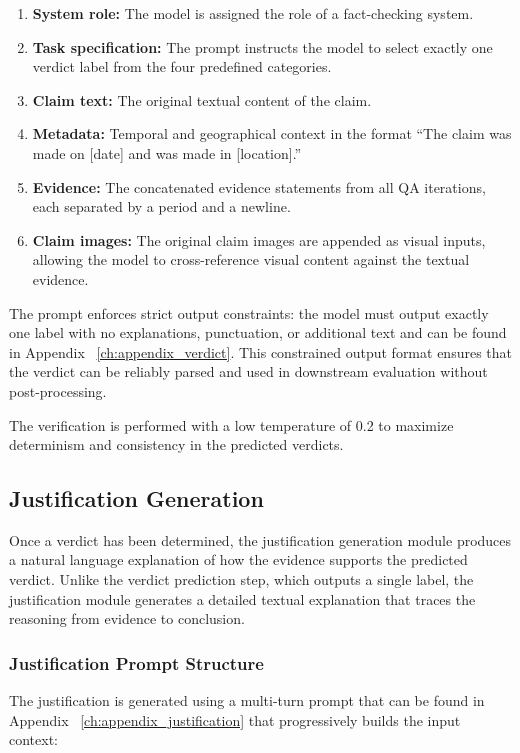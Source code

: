 \begin{enumerate}
    \item \textbf{System role:} The model is assigned the role of a fact-checking system.
    \item \textbf{Task specification:} The prompt instructs the model to select exactly one verdict label from the four predefined categories.
    \item \textbf{Claim text:} The original textual content of the claim.
    \item \textbf{Metadata:} Temporal and geographical context in the format ``The claim was made on [date] and was made in [location].''
    \item \textbf{Evidence:} The concatenated evidence statements from all QA iterations, each separated by a period and a newline.
    \item \textbf{Claim images:} The original claim images are appended as visual inputs, allowing the model to cross-reference visual content against the textual evidence.
\end{enumerate}

The prompt enforces strict output constraints: the model must output exactly one label with no explanations, punctuation, or additional text and can be found in Appendix ~\ref{ch:appendix_verdict}. This constrained output format ensures that the verdict can be reliably parsed and used in downstream evaluation without post-processing.

The verification is performed with a low temperature of 0.2 to maximize determinism and consistency in the predicted verdicts.

\subsection{Justification Generation}

Once a verdict has been determined, the justification generation module produces a natural language explanation of how the evidence supports the predicted verdict. Unlike the verdict prediction step, which outputs a single label, the justification module generates a detailed textual explanation that traces the reasoning from evidence to conclusion.

\subsubsection{Justification Prompt Structure}

The justification is generated using a multi-turn prompt that can be found in Appendix ~\ref{ch:appendix_justification} that progressively builds the input context:

